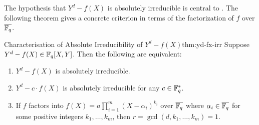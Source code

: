 The hypothesis that $Y^d - f(X)$ is absolutely irreducible is central to \Stepanov. The following theorem gives a concrete criterion in terms of the factorization of $f$ over $\overline{\mathbb{F}_q}$.
\begin{Theorem}{Characterisation of Absolute Irreducibility of $Y^d-f(X)$}{thm:yd-fx-irr}
  Suppose $Y^d-f(X)\in\mathbb{F}_q[X,Y]$. Then the following are equivalent:
  \begin{enumerate}[label=(\roman*)]
    \item $Y^d-f(X)$ is absolutely irreducible.
    \item $Y^d-c\cdot f(X)$ is absolutely irreducible for any $c\in\mathbb{F}_q^*$.
    \item If $f$ factors into $f(X)=a\prod_{i=1}^m(X-\alpha_i)^{k_i}$ over $\overline{\mathbb{F}_q}$ where $\alpha_i\in\overline{\mathbb{F}_q}$ for some positive integers $k_1,\dots, k_m$, then $r=\gcd(d,k_1,\dots, k_m)=1$.
  \end{enumerate}
\end{Theorem}
